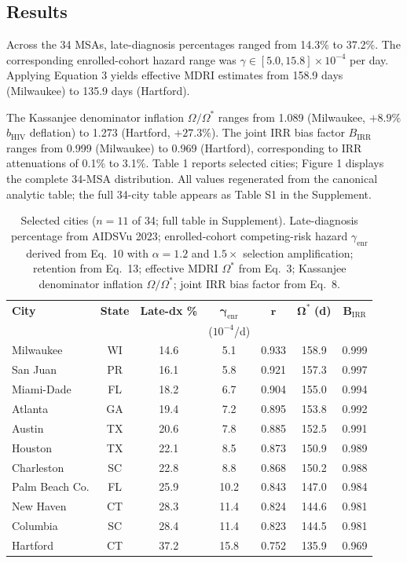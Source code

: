 \documentclass[12pt]{article}
\begin{document}
\subsection{Results}

Across the 34 MSAs, late-diagnosis percentages ranged from 14.3\% to 37.2\%. The corresponding enrolled-cohort hazard range was $\gamma \in [5.0, 15.8] \times 10^{-4}$ per day. Applying Equation 3 yields effective MDRI estimates from 158.9 days (Milwaukee) to 135.9 days (Hartford).

The Kassanjee denominator inflation $\Omega/\Omega^*$ ranges from 1.089 (Milwaukee, $+8.9\%$ $b_{\mathrm{HIV}}$ deflation) to 1.273 (Hartford, $+27.3\%$). The joint IRR bias factor $B_{\mathrm{IRR}}$ ranges from 0.999 (Milwaukee) to 0.969 (Hartford), corresponding to IRR attenuations of 0.1\% to 3.1\%. Table 1 reports selected cities; Figure 1 displays the complete 34-MSA distribution. All values regenerated from the canonical analytic table; the full 34-city table appears as Table S1 in the Supplement.

\begin{table}[H]
\centering
\caption{Selected cities ($n = 11$ of 34; full table in Supplement). Late-diagnosis percentage from AIDSVu 2023; enrolled-cohort competing-risk hazard $\gamma_{\mathrm{enr}}$ derived from Eq.\ 10 with $\alpha = 1.2$ and $1.5\times$ selection amplification; retention from Eq.\ 13; effective MDRI $\Omega^*$ from Eq.\ 3; Kassanjee denominator inflation $\Omega/\Omega^*$; joint IRR bias factor from Eq.\ 8.}
\label{tab:selected_cities}
\small
\begin{tabular}{lcccccc}
\toprule
\textbf{City} & \textbf{State} & \textbf{Late-dx \%} & $\boldsymbol{\gamma_{\mathrm{enr}}}$ & $\boldsymbol{r}$ & $\boldsymbol{\Omega^*}$ \textbf{(d)} & $\boldsymbol{B_{\mathrm{IRR}}}$ \\
 & & & ($10^{-4}$/d) & & & \\
\midrule
Milwaukee & WI & 14.6 & 5.1 & 0.933 & 158.9 & 0.999 \\
San Juan & PR & 16.1 & 5.8 & 0.921 & 157.3 & 0.997 \\
Miami-Dade & FL & 18.2 & 6.7 & 0.904 & 155.0 & 0.994 \\
Atlanta & GA & 19.4 & 7.2 & 0.895 & 153.8 & 0.992 \\
Austin & TX & 20.6 & 7.8 & 0.885 & 152.5 & 0.991 \\
Houston & TX & 22.1 & 8.5 & 0.873 & 150.9 & 0.989 \\
Charleston & SC & 22.8 & 8.8 & 0.868 & 150.2 & 0.988 \\
Palm Beach Co. & FL & 25.9 & 10.2 & 0.843 & 147.0 & 0.984 \\
New Haven & CT & 28.3 & 11.4 & 0.824 & 144.6 & 0.981 \\
Columbia & SC & 28.4 & 11.4 & 0.823 & 144.5 & 0.981 \\
Hartford & CT & 37.2 & 15.8 & 0.752 & 135.9 & 0.969 \\
\bottomrule
\end{tabular}
\end{table}
\end{document}
